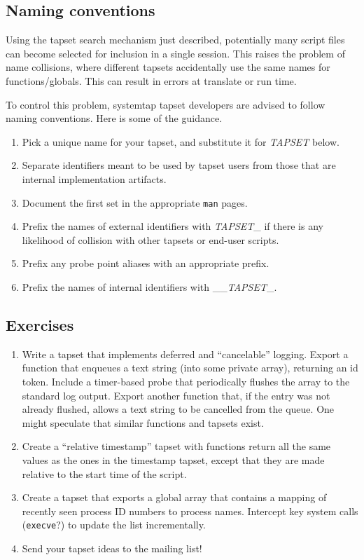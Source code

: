 \documentclass{article}
\renewcommand{\nomenclature}[2]{}
\begin{document}
\subsection{Naming conventions}

Using the tapset search mechanism just described, potentially many
script files can become selected for inclusion in a single session.
This raises the problem of name collisions, where different tapsets
accidentally use the same names for functions/globals.  This can
result in errors at translate or run time.

To control this problem, systemtap tapset developers are advised to
follow naming conventions.  Here is some of the guidance.
\nomenclature{naming convention}{Guidelines for naming variables and
functions to prevent unintentional duplication.}
\begin{enumerate}
\item Pick a unique name for your tapset, and substitute it for
{\em TAPSET} below.
\item Separate identifiers meant to be used by tapset users from
those that are internal implementation artifacts.
\item Document the first set in the appropriate \verb+man+ pages.
\item Prefix the names of external identifiers with {\em TAPSET}\_ if
there is any likelihood of collision with other tapsets or end-user
scripts.
\item Prefix any probe point aliases with an appropriate prefix.
\item Prefix the names of internal identifiers with \_\_{\em TAPSET}\_.
\end{enumerate}

\subsection{Exercises}

\begin{enumerate}
\item Write a tapset that implements deferred and ``cancelable''
logging.  Export a function that enqueues a text string (into some
private array), returning an id token.  Include a timer-based probe
that periodically flushes the array to the standard log output.
Export another function that, if the entry was not already flushed,
allows a text string to be cancelled from the queue.
One might speculate that similar functions and tapsets exist.

\item Create a ``relative timestamp'' tapset with functions return all
the same values as the ones in the timestamp tapset, except that they
are made relative to the start time of the script.

\item Create a tapset that exports a global array that contains a
mapping of recently seen process ID numbers to process names.
Intercept key system calls (\verb+execve+?) to update the list
incrementally.

\item Send your tapset ideas to the mailing list!
\end{enumerate}
\end{document}
